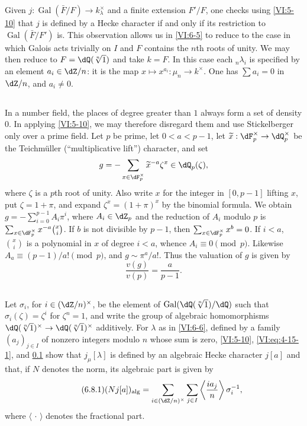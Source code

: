 \documentclass[12pt,oneside,english]{smfbook}
\DeclareMathOperator{\gal}{Gal}
\newcounter{char}
\begin{document}
Given $j:\gal(\bar F/F)\to k_\lambda^\times$ and a finite extension $F'/F$, one checks using \ref{VI:5-10} that $j$ is defined by a Hecke character if and only if its restriction to $\gal(\bar F/F')$ is. This observation allows us in \ref{VI:6-5} to reduce to the case in which Galois acts trivially on $I$ and $F$ contains the $n$th roots of unity. We may then reduce to $F=\dQ(\sqrt[n]{1})$ and take $k=F$. In this case each ${}_n\lambda_i$ is specified by an element $a_i\in\dZ/n$: it is the map $x\mapsto x^{a_i}:\mu_n\to k^\times$. One has $\sum a_i=0$ in $\dZ/n$, and $a_i\ne0$.

\subsection{}\label{VI:6-7}

In a number field, the places of degree greater than $1$ always form a set of density $0$. In applying \ref{VI:5-10}, we may therefore disregard them and use Stickelberger only over a prime field. Let $p$ be prime, let $0<a<p-1$, let $\widetilde{x}:\dF_p^\times\to\dQ_p^\times$ be the Teichmüller (``multiplicative lift'') character, and set
\[
  g=-\sum_{x\in\dF_p^\times}\widetilde{x}^{-a}\zeta^x
    \in\dQ_p(\zeta),
\]
where $\zeta$ is a $p$th root of unity. Also write $x$ for the integer in $[0,p-1]$ lifting $x$, put $\zeta=1+\pi$, and expand $\zeta^x=(1+\pi)^x$ by the binomial formula. We obtain $g=-\sum_{i=0}^{p-1}A_i\pi^i$, where $A_i\in\dZ_p$ and the reduction of $A_i$ modulo $p$ is $\sum_{x\in\dF_p^\times}x^{-a}\binom{x}{i}$. If $b$ is not divisible by $p-1$, then $\sum_{x\in\dF_p^\times}x^b=0$. If $i<a$, $\binom{x}{i}$ is a polynomial in $x$ of degree $i<a$, whence $A_i\equiv0\pmod p$. Likewise $A_a\equiv(p-1)/a!\pmod p$, and $g\sim\pi^a/a!$. Thus the valuation of $g$ is given by
\[
  \frac{v(g)}{v(p)}=\frac{a}{p-1}.
\]

\subsection{}\label{VI:6-8}

Let $\sigma_i$, for $i\in(\dZ/n)^\times$, be the element of $\gal(\dQ(\sqrt[n]{1})/\dQ)$ such that $\sigma_i(\zeta)=\zeta^i$ for $\zeta^n=1$, and write the group of algebraic homomorphisms $\dQ(\sqrt[n]{1})^\times\to\dQ(\sqrt[n]{1})^\times$ additively. For $\lambda$ as in \ref{VI:6-6}, defined by a family $(a_j)_{j\in I}$ of nonzero integers modulo $n$ whose sum is zero, \ref{VI:5-10}, \eqref{VI:eq:4-15-1}, and \ref{VI:6-7} show that $j_\mu[\lambda]$ is defined by an algebraic Hecke character $j[a]$ and that, if $N$ denotes the norm, its algebraic part is given by
\begin{equation*}\tag{6.8.1}\label{VI:eq:6-8-1}
  (N j[a])_{\mathrm{alg}}
  =\sum_{i\in(\dZ/n)^\times}\sum_{j\in I}
    \left\langle\frac{i a_j}{n}\right\rangle\sigma_i^{-1},
\end{equation*}
where $\langle\,\cdot\,\rangle$ denotes the fractional part.
\end{document}
